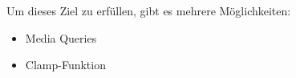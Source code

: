 

Um dieses Ziel zu erfüllen, gibt es mehrere Möglichkeiten:

\begin{itemize}
    \item Media Queries
    \item Clamp-Funktion
\end{itemize}



\clearpage
